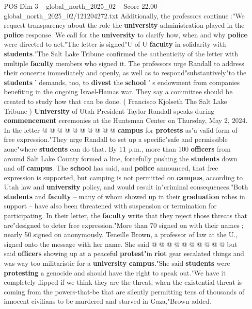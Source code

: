 \begin{textsample}{POS Dim 3 – global\_north\_2025\_02 – Score 22.00 – global\_north\_2025\_02/121204272.txt}
Additionally, the professors continue :"We request transparency about the role the \textbf{university} administration played in the \textbf{police} response.
We call for the \textbf{university} to clarify how, when and why \textbf{police} were directed to act."The letter is signed"U of U \textbf{faculty} in solidarity with \textbf{students}."The Salt Lake Tribune confirmed the authenticity of the letter with multiple \textbf{faculty} members who signed it.
The professors urge Randall to address their concerns immediately and openly, as well as to respond"substantively"to the \textbf{students} ' demands, too, to \textbf{divest} the \textbf{school} ' s endowment from companies benefiting in the ongoing Israel-Hamas war.
They say a committee should be created to study how that can be done. ( Francisco Kjolseth The Salt Lake Tribune ) \textbf{University} of Utah President Taylor Randall speaks during \textbf{commencement} ceremonies at the Huntsman Center on Thursday, May 2, 2024.
In the letter @ @ @ @ @ @ @ @ @ @ \textbf{campus} for \textbf{protests} as"a valid form of free expression."They urge Randall to set up a specific"safe and permissible zone"where \textbf{students} can do that.
By 11 p.m., more than 100 \textbf{officers} from around Salt Lake County formed a line, forcefully pushing the \textbf{students} down and off \textbf{campus}.
The \textbf{school} has said, and \textbf{police} announced, that free expression is supported, but camping is not permitted on \textbf{campus}, according to Utah law and \textbf{university} policy, and would result in"criminal consequences."Both \textbf{students} and \textbf{faculty} -- many of whom showed up in their \textbf{graduation} robes in support -- have also been threatened with suspension or termination for participating.
In their letter, the \textbf{faculty} write that they reject those threats that are"designed to deter free expression."More than 70 signed on with their names ; nearly 50 signed on anonymously.
Teneille Brown, a professor of law at the U., signed onto the message with her name.
She said @ @ @ @ @ @ @ @ @ @ but said \textbf{officers} showing up at a peaceful \textbf{protest}"in \textbf{riot} gear escalated things and was way too militaristic for a \textbf{university} \textbf{campus}."She said \textbf{students} were \textbf{protesting} a genocide and should have the right to speak out."We have it completely flipped if we think they are the threat, when the existential threat is coming from the powers-that-be that are silently permitting tens of thousands of innocent civilians to be murdered and starved in Gaza,"Brown added.

\end{textsample}
